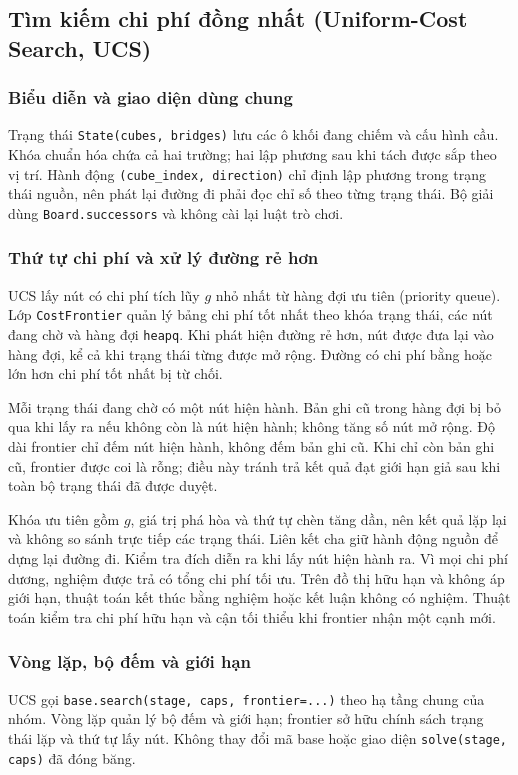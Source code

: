 \subsection{Tìm kiếm chi phí đồng nhất (Uniform-Cost Search, UCS)}
\label{sec:bloxorz-ucs}

\subsubsection{Biểu diễn và giao diện dùng chung}
Trạng thái \texttt{State(cubes, bridges)} lưu các ô khối đang chiếm và cấu hình
cầu. Khóa chuẩn hóa chứa cả hai trường; hai lập phương sau khi tách được sắp
theo vị trí. Hành động \texttt{(cube\_index, direction)} chỉ định lập phương
trong trạng thái nguồn, nên phát lại đường đi phải đọc chỉ số theo từng trạng
thái. Bộ giải dùng \texttt{Board.successors} và không cài lại luật trò chơi.



\subsubsection{Thứ tự chi phí và xử lý đường rẻ hơn}
UCS lấy nút có chi phí tích lũy $g$ nhỏ nhất từ hàng đợi ưu tiên (priority queue).
Lớp \texttt{CostFrontier} quản lý bảng chi phí tốt nhất theo khóa trạng thái,
các nút đang chờ và hàng đợi \texttt{heapq}. Khi phát hiện đường rẻ hơn, nút
được đưa lại vào hàng đợi, kể cả khi trạng thái từng được mở rộng. Đường có
chi phí bằng hoặc lớn hơn chi phí tốt nhất bị từ chối.

Mỗi trạng thái đang chờ có một nút hiện hành. Bản ghi cũ trong hàng đợi bị bỏ
qua khi lấy ra nếu không còn là nút hiện hành; không tăng số nút mở rộng.
Độ dài frontier chỉ đếm nút hiện hành, không đếm bản ghi cũ. Khi chỉ còn bản
ghi cũ, frontier được coi là rỗng; điều này tránh trả kết quả đạt giới hạn
giả sau khi toàn bộ trạng thái đã được duyệt.

Khóa ưu tiên gồm $g$, giá trị phá hòa và thứ tự chèn tăng dần, nên kết quả
lặp lại và không so sánh trực tiếp các trạng thái. Liên kết cha giữ hành động
nguồn để dựng lại đường đi. Kiểm tra đích diễn ra khi lấy nút hiện hành ra.
Vì mọi chi phí dương, nghiệm được trả có tổng chi phí tối ưu. Trên đồ thị
hữu hạn và không áp giới hạn, thuật toán kết thúc bằng nghiệm hoặc kết luận
không có nghiệm. Thuật toán kiểm tra chi phí hữu hạn và cận tối thiểu khi
frontier nhận một cạnh mới.

\subsubsection{Vòng lặp, bộ đếm và giới hạn}
UCS gọi \texttt{base.search(stage, caps, frontier=...)} theo hạ tầng chung
của nhóm. Vòng lặp quản lý bộ đếm và giới hạn; frontier sở hữu chính sách
trạng thái lặp và thứ tự lấy nút. Không thay đổi mã base hoặc giao diện
\texttt{solve(stage, caps)} đã đóng băng.

